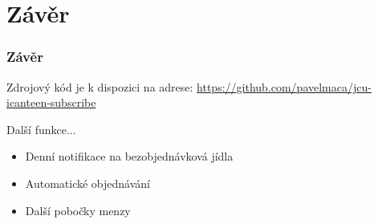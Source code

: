 \documentclass[slidestop]{beamer}
\begin{document}
\section{Závěr}
\begin{frame}
\frametitle{Závěr}
\vfill
Zdrojový kód je k dispozici na adrese:
\href{https://github.com/pavelmaca/jcu-icanteen-subscribe}{https://github.com/pavelmaca/jcu-icanteen-subscribe} 

 \begin{block}{Další funkce...}
        \begin{itemize}
        \item Denní notifikace na bezobjednávková jídla
        \item Automatické objednávání
        \item Další pobočky menzy
        \end{itemize}
        \end{block}
\vfill
\end{frame}
\end{document}
